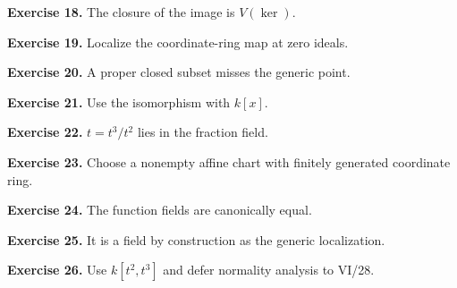 \noindent\textbf{Exercise 18.} The closure of the image is $V(\ker)$.\par

\noindent\textbf{Exercise 19.} Localize the coordinate-ring map at zero ideals.\par

\noindent\textbf{Exercise 20.} A proper closed subset misses the generic point.\par

\noindent\textbf{Exercise 21.} Use the isomorphism with $k[x]$.\par

\noindent\textbf{Exercise 22.} $t=t^3/t^2$ lies in the fraction field.\par

\noindent\textbf{Exercise 23.} Choose a nonempty affine chart with finitely generated coordinate ring.\par

\noindent\textbf{Exercise 24.} The function fields are canonically equal.\par

\noindent\textbf{Exercise 25.} It is a field by construction as the generic localization.\par

\noindent\textbf{Exercise 26.} Use $k[t^2,t^3]$ and defer normality analysis to VI/28.\par
